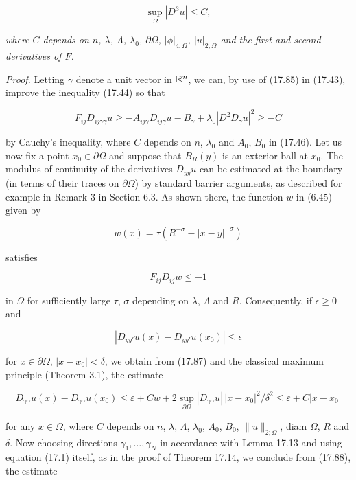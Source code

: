 \begin{equation}
\tag{17.86}
\sup_{\Omega} |D^3u| \leq C,
\end{equation}

\emph{where $C$ depends on $n$, $\lambda$, $\Lambda$, $\lambda_0$, $\partial\Omega$, $|\phi|_{4;\Omega}$, $|u|_{2;\Omega}$ and the first and second derivatives of $F$.}

\emph{Proof.} Letting $\gamma$ denote a unit vector in $\mathbb{R}^n$, we can, by use of (17.85) in (17.43), improve the inequality (17.44) so that

\begin{equation}
\tag{17.87}
F_{ij}D_{ij\gamma\gamma}u \geq -A_{ij\gamma}D_{ij\gamma}u - B_{\gamma} + \lambda_0|D^2D_{\gamma}u|^2
\geq -C
\end{equation}

by Cauchy's inequality, where $C$ depends on $n$, $\lambda_0$ and $A_0$, $B_0$ in (17.46). Let us now fix a point $x_0 \in \partial\Omega$ and suppose that $B_R(y)$ is an exterior ball at $x_0$. The modulus of continuity of the derivatives $D_{yy}u$ can be estimated at the boundary (in terms of their traces on $\partial\Omega$) by standard barrier arguments, as described for example in Remark 3 in Section 6.3. As shown there, the function $w$ in (6.45) given by

\[
w(x)=\tau(R^{-\sigma}-|x-y|^{-\sigma})
\]

satisfies

\[
F_{ij}D_{ij}w \leq -1
\]

in $\Omega$ for sufficiently large $\tau$, $\sigma$ depending on $\lambda$, $\Lambda$ and $R$. Consequently, if $\epsilon \geq 0$ and

\[
|D_{yy'}u(x)-D_{yy'}u(x_0)| \leq \epsilon
\]


for $x \in \partial \Omega$, $|x - x_0| < \delta$, we obtain from (17.87) and the classical maximum principle (Theorem 3.1), the estimate

\begin{equation}
\tag{17.88}
D_{\gamma \gamma} u(x) - D_{\gamma \gamma} u(x_0) \leq \varepsilon + C w + 2 \sup_{\partial \Omega} |D_{\gamma \gamma} u| \, |x - x_0|^2 / \delta^2
\leq \varepsilon + C |x - x_0|
\end{equation}

for any $x \in \Omega$, where $C$ depends on $n$, $\lambda$, $\Lambda$, $\lambda_0$, $A_0$, $B_0$, $\|u\|_{2;\Omega}$, diam $\Omega$, $R$ and $\delta$. Now choosing directions $\gamma_1, \ldots, \gamma_N$ in accordance with Lemma 17.13 and using equation (17.1) itself, as in the proof of Theorem 17.14, we conclude from (17.88), the estimate

